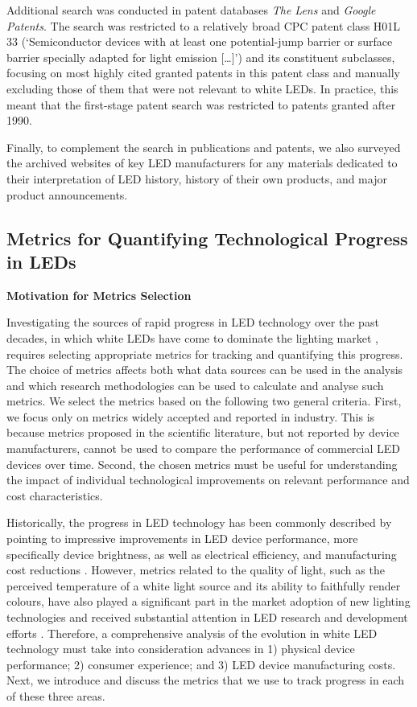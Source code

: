 \documentclass[parskip=full]{article}
\begin{document}
Additional search was conducted in patent databases \textit{The Lens} and \textit{Google Patents}. The search was restricted to a relatively broad CPC patent class H01L 33 (‘Semiconductor devices with at least one potential-jump barrier or surface barrier specially adapted for light emission […]’) and its constituent subclasses, focusing on most highly cited granted patents in this patent class and manually excluding those of them that were not relevant to white LEDs. In practice, this meant that the first-stage patent search was restricted to patents granted after 1990. 

Finally, to complement the search in publications and patents, we also surveyed the archived websites of key LED manufacturers for any materials dedicated to their interpretation of LED history, history of their own products, and major product announcements.

\clearpage

\subsection{Metrics for Quantifying Technological Progress in LEDs}

\textbf{Motivation for Metrics Selection}

Investigating the sources of rapid progress in LED technology over the past decades, in which white LEDs have come to dominate the lighting market \cite{zissis2021}, requires selecting appropriate metrics for tracking and quantifying this progress. The choice of metrics affects both what data sources can be used in the analysis and which research methodologies can be used to calculate and analyse such metrics. We select the metrics based on the following two general criteria. First, we focus only on metrics widely accepted and reported in industry. This is because metrics proposed in the scientific literature, but not reported by device manufacturers, cannot be used to compare the performance of commercial LED devices over time. Second, the chosen metrics must be useful for understanding the impact of individual technological improvements on relevant performance and cost characteristics.

Historically, the progress in LED technology has been commonly described by pointing to impressive improvements in LED device performance, more specifically device brightness, as well as electrical efficiency, and manufacturing cost reductions \cite{Taki2019}. However, metrics related to the quality of light, such as the perceived temperature of a white light source and its ability to faithfully render colours, have also played a significant part in the market adoption of new lighting technologies \cite{Menanteau2000,Sandahl2006,CAIRD2008,murphy2012governing} and received substantial attention in LED research and development efforts \cite{azevedo2009transition,cho2017white}. Therefore, a comprehensive analysis of the evolution in white LED technology must take into consideration advances in 1) physical device performance; 2) consumer experience; and 3) LED device manufacturing costs. Next, we introduce and discuss the metrics that we use to track progress in each of these three areas.
\end{document}

